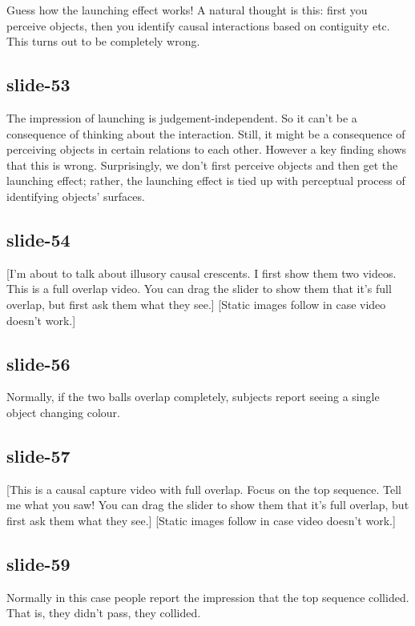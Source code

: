 \documentclass[12pt,\papersize]{extarticle}
\begin{document}
Guess  how the launching effect works!  
A natural thought is this: first you perceive objects, then you identify causal interactions 
based on contiguity etc.
This turns out to be completely wrong.
 
\subsection{slide-53}
The impression of launching is judgement-independent.
So it can't be a consequence of thinking about the interaction.
Still, it might be a consequence of perceiving objects in certain relations to each other.
However a key finding shows that this is wrong.
Surprisingly, we don't first perceive objects and then get the launching effect;
rather, the launching effect is tied up with perceptual process of identifying objects' surfaces.
 
\subsection{slide-54}
[I'm about to talk about illusory causal crescents.  I first show them two videos.
This is a full overlap video.
You can drag the slider to show them that it's full overlap, but first ask them what they see.]
[Static images follow in case video doesn't work.]
 
\subsection{slide-56}
Normally, if the two balls overlap completely, subjects report seeing a single object 
changing colour.
 
\subsection{slide-57}
[This is a causal capture video with full overlap.
Focus on the top sequence.  Tell me what you saw!
You can drag the slider to show them that it's full overlap, but first ask them what they see.]
[Static images follow in case video doesn't work.]
 
\subsection{slide-59}
Normally in this case people report the impression that the top sequence collided.
That is, they didn't pass, they collided.
 
\end{document}
